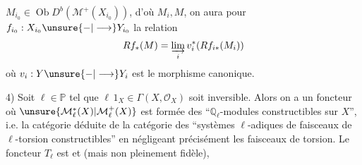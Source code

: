 $M_{i_0}\in\operatorname{Ob}D^b(\mathcal{M}^+(X_{i_0}))$, d'où $M_i,M$, on
aura pour $f_{i_0}:X_{i_0}\unsure{-|\longrightarrow}Y_{i_0}$ la relation
\[
 Rf_*(M)=\varinjlim_i v_i^*(Rf_{i*}(M_i))
\]
où $v_i:Y\unsure{-|\longrightarrow}Y_i$ est le morphisme
canonique.

4) Soit $\ell\in\mathbb{P}$ tel que $\ell\,1_X\in\Gamma(X,\mathcal O_X)$ soit
inversible. Alors on a un foncteur
où $\unsure{\mathcal{M}_\ell^*(X)|\mathcal{M}_\ell^+(X)}$ est 
formée des ``$\mathbb{Q}_\ell$-modules
constructibles sur $X$'', i.e. la catégorie
déduite de la catégorie des ``systèmes
$\ell$-adiques de faisceaux de $\ell$-torsion
constructibles'' en négligeant précisément
les faisceaux de torsion.
Le foncteur
$T_\ell$ est 
 et  (mais non
pleinement fidèle), 
